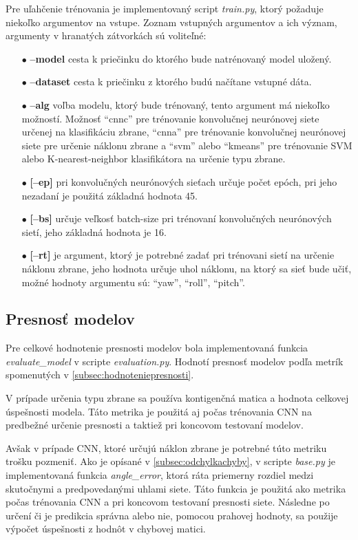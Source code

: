 Pre uľahčenie trénovania je implementovaný script \textit{train.py}, ktorý požaduje niekoľko argumentov na vstupe.
Zoznam vstupných argumentov a ich význam, argumenty v hranatých zátvorkách sú voliteľné:
\begin{enumerate}
    \item[$\bullet$] \textbf{--model} cesta k priečinku do ktorého bude natrénovaný model uložený.
    \item[$\bullet$] \textbf{--dataset} cesta k priečinku z ktorého budú načítane vstupné dáta.
    \item[$\bullet$] \textbf{--alg} voľba modelu, ktorý bude trénovaný, tento argument má niekoľko možností.
    Možnosť ``cnnc'' pre trénovanie konvolučnej neurónovej siete určenej na klasifikáciu zbrane,
    ``cnna'' pre trénovanie konvolučnej neurónovej siete pre určenie náklonu zbrane a
    ``svm'' alebo ``kmeans'' pre trénovanie SVM alebo K-nearest-neighbor klasifikátora na určenie typu zbrane.
    \item[$\bullet$] \textbf{[--ep]} pri konvolučných neurónových sieťach určuje počet epóch, pri jeho nezadaní je použitá
    základná hodnota 45.
    \item[$\bullet$] \textbf{[--bs]} určuje veľkosť batch-size pri trénovaní konvolučných neurónových sietí, jeho
    základná hodnota je 16.
    \item[$\bullet$] \textbf{[--rt]} je argument, ktorý je potrebné zadať pri trénovani sietí na určenie náklonu zbrane,
    jeho hodnota určuje uhol náklonu, na ktorý sa sieť bude učiť, možné hodnoty argumentu sú: ``yaw'', ``roll'', ``pitch''.
\end{enumerate}

\subsection{Presnosť modelov}
\label{subsec:presnostmodelov}
Pre celkové hodnotenie presnosti modelov bola implementovaná funkcia \textit{evaluate\_model} v scripte \textit{evaluation.py}.
Hodnotí presnosť modelov podľa metrík spomenutých v \ref{subsec:hodnoteniepresnosti}.

V prípade určenia typu zbrane sa používa kontigenčná matica a hodnota celkovej úspešnosti modela.
Táto metrika je použitá aj počas trénovania CNN na predbežné určenie presnosti a taktiež pri koncovom testovaní modelov.

Avšak v prípade CNN, ktoré určujú náklon zbrane je potrebné túto metriku trošku pozmeniť.
Ako je opísané v \ref{subsec:odchylkachyby}, v scripte \textit{base.py} je implementovaná funkcia \textit{angle\_error}, ktorá ráta priemerny rozdiel medzi
    skutočnymi a predpovedanými uhlami siete.
Táto funkcia je použitá ako metrika počas trénovania CNN a pri koncovom testovaní presnosti siete.
Následne po určení či je predikcia správna alebo nie, pomocou prahovej hodnoty, sa použije výpočet úspešnosti z hodnôt v chybovej matici.
